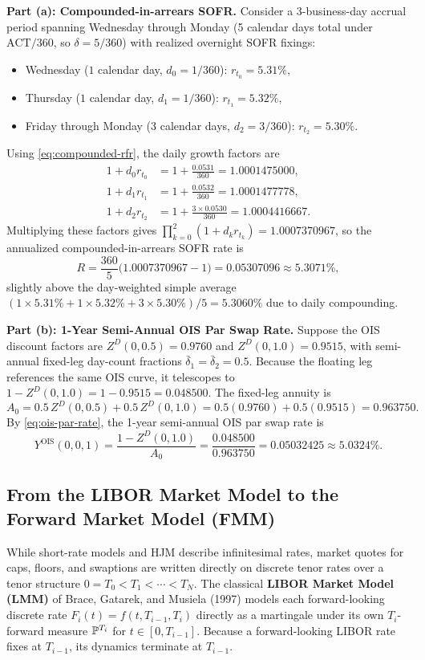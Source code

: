 \begin{example}\label{ex:sofr-ois}
    \textbf{Part (a): Compounded-in-arrears SOFR.} Consider a 3-business-day accrual period spanning Wednesday through Monday (5 calendar days total under $\text{ACT}/360$, so $\delta = 5/360$) with realized overnight SOFR fixings:
    \begin{itemize}
        \item Wednesday ($1$ calendar day, $d_0 = 1/360$): $r_{t_0} = 5.31\%$,
        \item Thursday ($1$ calendar day, $d_1 = 1/360$): $r_{t_1} = 5.32\%$,
        \item Friday through Monday ($3$ calendar days, $d_2 = 3/360$): $r_{t_2} = 5.30\%$.
    \end{itemize}
    Using \eqref{eq:compounded-rfr}, the daily growth factors are
    \begin{align*}
    1 + d_0 r_{t_0} &= 1 + \frac{0.0531}{360} = 1.0001475000, \\
    1 + d_1 r_{t_1} &= 1 + \frac{0.0532}{360} = 1.0001477778, \\
    1 + d_2 r_{t_2} &= 1 + \frac{3 \times 0.0530}{360} = 1.0004416667.
    \end{align*}
    Multiplying these factors gives $\prod_{k=0}^{2}(1 + d_k r_{t_k}) = 1.0007370967$, so the annualized compounded-in-arrears SOFR rate is
    \[
    R = \frac{360}{5}\bigl(1.0007370967 - 1\bigr) = 0.05307096 \approx 5.3071\%,
    \]
    slightly above the day-weighted simple average $(1 \times 5.31\% + 1 \times 5.32\% + 3 \times 5.30\%)/5 = 5.3060\%$ due to daily compounding.

    \textbf{Part (b): 1-Year Semi-Annual OIS Par Swap Rate.} Suppose the OIS discount factors are $Z^D(0, 0.5) = 0.9760$ and $Z^D(0, 1.0) = 0.9515$, with semi-annual fixed-leg day-count fractions $\bar{\delta}_1 = \bar{\delta}_2 = 0.5$. Because the floating leg references the same OIS curve, it telescopes to $1 - Z^D(0, 1.0) = 1 - 0.9515 = 0.048500$. The fixed-leg annuity is
    \[
    A_0 = 0.5\,Z^D(0, 0.5) + 0.5\,Z^D(0, 1.0) = 0.5(0.9760) + 0.5(0.9515) = 0.963750.
    \]
    By \eqref{eq:ois-par-rate}, the 1-year semi-annual OIS par swap rate is
    \[
    Y^{\mathrm{OIS}}(0, 0, 1) = \frac{1 - Z^D(0, 1.0)}{A_0} = \frac{0.048500}{0.963750} = 0.05032425 \approx 5.0324\%.
    \]
\end{example}

\subsection*{From the LIBOR Market Model to the Forward Market Model (FMM)}
While short-rate models and HJM describe infinitesimal rates, market quotes for caps, floors, and swaptions are written directly on discrete tenor rates over a tenor structure $0 = T_0 < T_1 < \cdots < T_N$. The classical \textbf{LIBOR Market Model (LMM)} of Brace, Gatarek, and Musiela (1997) models each forward-looking discrete rate $F_i(t) = f(t, T_{i-1}, T_i)$ directly as a martingale under its own $T_i$-forward measure $\mathbb{P}^{T_i}$ for $t \in [0, T_{i-1}]$. Because a forward-looking LIBOR rate fixes at $T_{i-1}$, its dynamics terminate at $T_{i-1}$.

